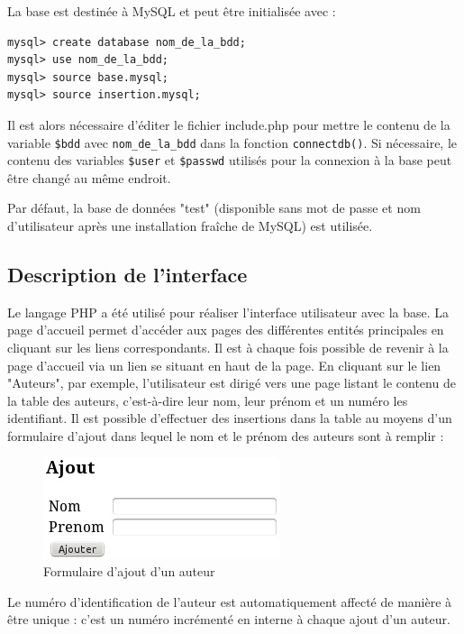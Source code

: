 \documentclass[12pt]{article}
\begin{document}
La base est destinée à MySQL et peut être initialisée avec :
\begin{verbatim}
mysql> create database nom_de_la_bdd;
mysql> use nom_de_la_bdd;
mysql> source base.mysql;
mysql> source insertion.mysql;
\end{verbatim}

Il est alors nécessaire d'éditer le fichier include.php pour mettre le contenu
de la variable \verb!$bdd! avec \verb!nom_de_la_bdd! dans la fonction
\verb!connectdb()!. Si nécessaire, le contenu des variables \verb!$user! et
\verb!$passwd! utilisés pour la connexion à la base peut être changé au même
endroit.

Par défaut, la base de données "test" (disponible sans mot de passe et nom
d'utilisateur après une installation fraîche de MySQL) est utilisée.


\subsection{Description de l'interface}

Le langage PHP a été utilisé pour réaliser l'interface utilisateur avec la
base. La page d'accueil permet d'accéder aux pages des différentes entités
principales en cliquant sur les liens correspondants. Il est à chaque fois
possible de revenir à la page d'accueil via un lien se situant en haut de la
page. En cliquant sur le lien "Auteurs", par exemple, l'utilisateur est dirigé
vers une page listant le contenu de la table des auteurs, c'est-à-dire leur
nom, leur prénom et un numéro les identifiant. Il est possible d'effectuer des
insertions dans la table au moyens d'un formulaire d'ajout dans lequel le nom
et le prénom des auteurs sont à remplir :

\begin{figure}[h!]
\begin{center}
\noindent\includegraphics[]{formulaire-ajout-auteur}
  \caption{Formulaire d'ajout d'un auteur}
\end{center}
\end{figure}

Le numéro d'identification de l'auteur est automatiquement affecté de manière
à être unique : c'est un numéro incrémenté en interne à chaque ajout d'un
auteur.
\end{document}
